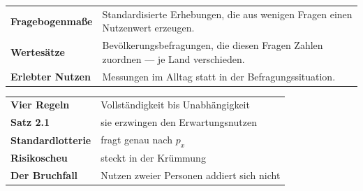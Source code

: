 \begin{forschung}
\begin{center}
{\small
\renewcommand{\arraystretch}{1.45}
\begin{tabular}{@{}P{3.0cm}P{5.2cm}@{}}
\toprule
\textbf{Fragebogenmaße} & Standardisierte Erhebungen, die aus wenigen Fragen einen Nutzenwert erzeugen.\\
\textbf{Wertesätze} & Bevölkerungsbefragungen, die diesen Fragen Zahlen zuordnen --- je Land verschieden.\\
\textbf{Erlebter Nutzen} & Messungen im Alltag statt in der Befragungssituation.\\
\bottomrule
\end{tabular}}
\end{center}

\begin{center}
\begin{minipage}{0.88\textwidth}
\end{minipage}
\end{center}
\end{forschung}

\begin{merksatz}
\begin{center}
\renewcommand{\arraystretch}{1.5}
\begin{tabular}{@{}P{3.0cm}P{5.6cm}@{}}
\toprule
\textbf{Vier Regeln} & Vollständigkeit bis Unabhängigkeit\\
\textbf{Satz 2.1} & sie erzwingen den Erwartungsnutzen\\
\textbf{Standardlotterie} & fragt genau nach $p_x$\\
\textbf{Risikoscheu} & steckt in der Krümmung\\
\textbf{Der Bruchfall} & Nutzen zweier Personen addiert sich nicht\\
\bottomrule
\end{tabular}
\end{center}

\begin{center}
\begin{minipage}{0.88\textwidth}
\end{minipage}
\end{center}
\end{merksatz}
